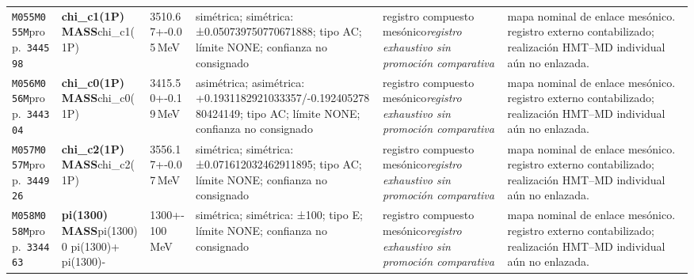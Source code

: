 \begin{landscape}
\begin{longtable}{L{1.85cm}L{4.45cm}L{2.35cm}L{4.05cm}L{3.35cm}L{7.15cm}}
\texttt{M055}\newline \texttt{M055M}\newline prop.\ \texttt{344598} & \textbf{chi\_\allowbreak{}c1(1P) MASS}\newline chi\_\allowbreak{}c1(1P) & 3510.67+-0.05\,MeV & simétrica; simétrica: ±0.050739750770671888; tipo AC; límite NONE; confianza no consignado & registro compuesto mesónico\newline \emph{registro exhaustivo sin promoción comparativa} & mapa nominal de enlace mesónico. registro externo contabilizado; realización HMT--MD individual aún no enlazada. \\
\texttt{M056}\newline \texttt{M056M}\newline prop.\ \texttt{344304} & \textbf{chi\_\allowbreak{}c0(1P) MASS}\newline chi\_\allowbreak{}c0(1P) & 3415.50+-0.19\,MeV & asimétrica; asimétrica: +0.1931182921033357/-0.19240527880424149; tipo AC; límite NONE; confianza no consignado & registro compuesto mesónico\newline \emph{registro exhaustivo sin promoción comparativa} & mapa nominal de enlace mesónico. registro externo contabilizado; realización HMT--MD individual aún no enlazada. \\
\texttt{M057}\newline \texttt{M057M}\newline prop.\ \texttt{344926} & \textbf{chi\_\allowbreak{}c2(1P) MASS}\newline chi\_\allowbreak{}c2(1P) & 3556.17+-0.07\,MeV & simétrica; simétrica: ±0.071612032462911895; tipo AC; límite NONE; confianza no consignado & registro compuesto mesónico\newline \emph{registro exhaustivo sin promoción comparativa} & mapa nominal de enlace mesónico. registro externo contabilizado; realización HMT--MD individual aún no enlazada. \\
\texttt{M058}\newline \texttt{M058M}\newline prop.\ \texttt{334463} & \textbf{pi(1300) MASS}\newline pi(1300)0 \textbar{}\allowbreak{} pi(1300)+ \textbar{}\allowbreak{} pi(1300)- & 1300+-100\,MeV & simétrica; simétrica: ±100; tipo E; límite NONE; confianza no consignado & registro compuesto mesónico\newline \emph{registro exhaustivo sin promoción comparativa} & mapa nominal de enlace mesónico. registro externo contabilizado; realización HMT--MD individual aún no enlazada. \\

\end{longtable}
\end{landscape}
